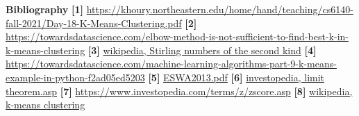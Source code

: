 \documentclass[12pt]{article}
\begin{document}
\newpage
\textbf{Bibliography} \newline
\textbf{[1]} \href{https://khoury.northeastern.edu/home/hand/teaching/cs6140-fall-2021/Day-18-K-Means-Clustering.pdf}{https://khoury.northeastern.edu/home/hand/teaching/cs6140-fall-2021/Day-18-K-Means-Clustering.pdf} \newline
\textbf{[2]} \href{https://towardsdatascience.com/elbow-method-is-not-sufficient-to-find-best-k-in-k-means-clustering-fc820da0631d#:~:text=The%20elbow%20method%20is%20a,cluster%20and%20the%20cluster%20centroid.}{https://towardsdatascience.com/elbow-method-is-not-sufficient-to-find-best-k-in-k-means-clustering} \newline
\textbf{[3]} \href{https://en.wikipedia.org/wiki/Stirling_numbers_of_the_second_kind}{wikipedia, Stirling numbers of the second kind} \newline
\textbf{[4]} \href{https://towardsdatascience.com/machine-learning-algorithms-part-9-k-means-example-in-python-f2ad05ed5203}{https://towardsdatascience.com/machine-learning-algorithms-part-9-k-means-example-in-python-f2ad05ed5203} \newline
\textbf{[5]} \href{https://faculty.uca.edu/ecelebi/documents/ESWA_2013.pdf}{ESWA2013.pdf} \newline
\textbf{[6]} \href{https://www.investopedia.com/terms/c/central_limit_theorem.asp#:~:text=Key%20Takeaways-,The%20central%20limit%20theorem%20(CLT)%20states%20that%20the%20distribution%20of,for%20the%20CLT%20to%20hold.}{investopedia, limit theorem.asp} \newline
\textbf{[7]} \href{https://www.investopedia.com/terms/z/zscore.asp#:~:text=Investopedia%20%2F%20Tara%20Anand-,What%20Is%20Z%2DScore%3F,identical%20to%20the%20mean%20score.}{https://www.investopedia.com/terms/z/zscore.asp} \newline
\textbf{[8]}
\href{https://en.wikipedia.org/wiki/K-means_clustering}{wikipedia, k-means clustering}
\end{document}
